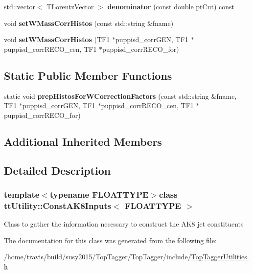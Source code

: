 \begin{DoxyCompactItemize}
\item 
\hypertarget{classttUtility_1_1ConstAK8Inputs_ab30438c09182769fba7c12d506a677a3}{std\-::vector$<$ T\-Lorentz\-Vector $>$ {\bfseries denominator} (const double pt\-Cut) const }\label{classttUtility_1_1ConstAK8Inputs_ab30438c09182769fba7c12d506a677a3}

\item 
\hypertarget{classttUtility_1_1ConstAK8Inputs_a5734dc3413d1131ded1fcd3e7d29fcd1}{void {\bfseries set\-W\-Mass\-Corr\-Histos} (const std\-::string \&fname)}\label{classttUtility_1_1ConstAK8Inputs_a5734dc3413d1131ded1fcd3e7d29fcd1}

\item 
\hypertarget{classttUtility_1_1ConstAK8Inputs_a4409e140d025cf8f277934975715d512}{void {\bfseries set\-W\-Mass\-Corr\-Histos} (T\-F1 $\ast$puppisd\-\_\-corr\-G\-E\-N, T\-F1 $\ast$puppisd\-\_\-corr\-R\-E\-C\-O\-\_\-cen, T\-F1 $\ast$puppisd\-\_\-corr\-R\-E\-C\-O\-\_\-for)}\label{classttUtility_1_1ConstAK8Inputs_a4409e140d025cf8f277934975715d512}

\end{DoxyCompactItemize}
\subsection*{Static Public Member Functions}
\begin{DoxyCompactItemize}
\item 
\hypertarget{classttUtility_1_1ConstAK8Inputs_aa693665ad5ea4399205db48ca5156ac8}{static void {\bfseries prep\-Histos\-For\-W\-Correction\-Factors} (const std\-::string \&fname, T\-F1 $\ast$puppisd\-\_\-corr\-G\-E\-N, T\-F1 $\ast$puppisd\-\_\-corr\-R\-E\-C\-O\-\_\-cen, T\-F1 $\ast$puppisd\-\_\-corr\-R\-E\-C\-O\-\_\-for)}\label{classttUtility_1_1ConstAK8Inputs_aa693665ad5ea4399205db48ca5156ac8}

\end{DoxyCompactItemize}
\subsection*{Additional Inherited Members}


\subsection{Detailed Description}
\subsubsection*{template$<$typename F\-L\-O\-A\-T\-T\-Y\-P\-E$>$class tt\-Utility\-::\-Const\-A\-K8\-Inputs$<$ F\-L\-O\-A\-T\-T\-Y\-P\-E $>$}

Class to gather the information necessary to construct the A\-K8 jet constituents 

The documentation for this class was generated from the following file\-:\begin{DoxyCompactItemize}
\item 
/home/travis/build/susy2015/\-Top\-Tagger/\-Top\-Tagger/include/\hyperlink{TopTaggerUtilities_8h}{Top\-Tagger\-Utilities.\-h}\end{DoxyCompactItemize}
